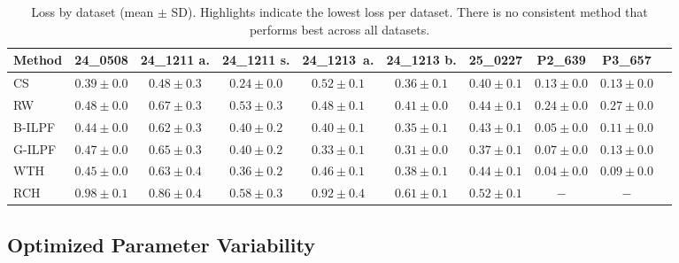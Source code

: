 \documentclass[iucr]{iucrjournals}
\begin{document}
\begin{table}[t]
\caption{Loss by dataset (mean $\pm$ SD). Highlights indicate the lowest loss per dataset. There is no consistent method that performs best across all datasets.}
\label{tab:method_by_dataset}
\centering
\small
\setlength{\tabcolsep}{4pt}
\renewcommand{\arraystretch}{1.0}
\begin{tabular}{@{}lccccccccc@{}}
\toprule
\textbf{Method} & \textbf{24\_0508} & \textbf{24\_1211 a.} & \textbf{24\_1211 s.} & \textbf{24\_1213\ a.} & \textbf{24\_1213 b.} & \textbf{25\_0227} & \textbf{P2\_639} & \textbf{P3\_657} \\
\midrule


CS & \cellcolor{yellow!30}$0.39 \pm 0.0$ & \cellcolor{yellow!30}\textbf{$0.48 \pm 0.3$} & \cellcolor{yellow!30}\textbf{$0.24 \pm 0.0$} & $0.52 \pm 0.1$ & $0.36 \pm 0.1$ & $0.40 \pm 0.1$ & $0.13 \pm 0.0$ & $0.13 \pm 0.0$ \\
RW & $0.48 \pm 0.0$ & $0.67 \pm 0.3$ & $0.53 \pm 0.3$ & $0.48 \pm 0.1$ & $0.41 \pm 0.0$ & $0.44 \pm 0.1$ & $0.24 \pm 0.0$ & $0.27 \pm 0.0$ \\
B-ILPF & $0.44 \pm 0.0$ & $0.62 \pm 0.3$ & $0.40 \pm 0.2$ & $0.40 \pm 0.1$ & $0.35 \pm 0.1$ & $0.43 \pm 0.1$ & $0.05 \pm 0.0$ & $0.11 \pm 0.0$ \\
G-ILPF & $0.47 \pm 0.0$ & $0.65 \pm 0.3$ & $0.40 \pm 0.2$ & \cellcolor{yellow!30}\textbf{$0.33 \pm 0.1$} & \cellcolor{yellow!30}\textbf{$0.31 \pm 0.0$} & \cellcolor{yellow!30}\textbf{$0.37 \pm 0.1$} & $0.07 \pm 0.0$ & $0.13 \pm 0.0$ \\
WTH & $0.45 \pm 0.0$ & $0.63 \pm 0.4$ & $0.36 \pm 0.2$ & $0.46 \pm 0.1$ & $0.38 \pm 0.1$ & $0.44 \pm 0.1$ & \cellcolor{yellow!30}\textbf{$0.04 \pm 0.0$} & \cellcolor{yellow!30}\textbf{$0.09 \pm 0.0$} \\
RCH & $0.98 \pm 0.1$ & $0.86 \pm 0.4$ & $0.58 \pm 0.3$ & $0.92 \pm 0.4$ & $0.61 \pm 0.1$ & $0.52 \pm 0.1$ & $-$ & $-$ \\


\bottomrule
\end{tabular}
\end{table}



\subsection{Optimized Parameter Variability}
\end{document}

